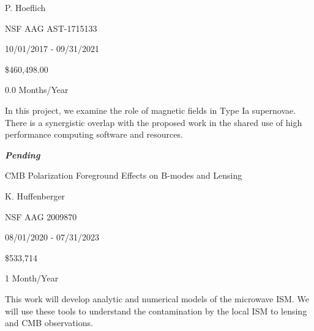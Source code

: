 \documentclass[10pt]{article}
\begin{document}
 P. Hoeflich 

 NSF AAG AST-1715133

 10/01/2017 - 09/31/2021 

 \$460,498.00

 0.0 Months/Year

 In this project, we examine the role of magnetic fields in
Type Ia supernovae.  There
is a synergistic overlap with the proposed work in the shared use of high
performance computing software and resources.


\vspace{0.1in}

\noindent \large{\textbf{\emph{Pending}}}

 CMB Polarization Foreground Effects on B-modes and Lensing

 K. Huffenberger

 NSF AAG 2009870

 08/01/2020 - 07/31/2023

 \$533,714

 1 Month/Year

This work will develop analytic and numerical models of the microwave ISM. We
will use these tools to understand the contamination by the local ISM to lensing
and CMB observations.

\vspace{0.1in}
\end{document}

